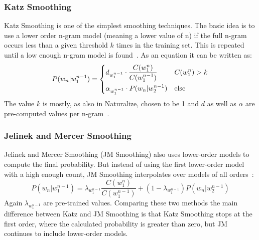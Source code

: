 \subsubsection{Katz Smoothing}
Katz Smoothing is one of the simplest smoothing techniques. The basic idea is to use a lower order n-gram model (meaning a lower value of n) if the full n-gram occurs less than a given threshold $k$ times in the training set. This is repeated until a low enough n-gram model is found~\cite{katz1987estimation}. As an equation it can be written as:
\begin{equation}
    P(w_n | w_1^{n-1}) = 
    \begin{dcases}
    d_{w_1^{n-1}}\cdot \frac{C(w_1^n)}{C(w_1^{n-1})} & C(w_1^n) > k\\
    \alpha_{w_1^{n-1}} \cdot P(w_n | w_2^{n-1}) & \text{else}
    \end{dcases}
\end{equation}
The value $k$ is mostly, as also in Naturalize, chosen to be 1 and $d$ as well as $\alpha$ are pre-computed values per n-gram~\cite{katz1987estimation}.
\subsubsection{Jelinek and Mercer Smoothing}
Jelinek and Mercer Smoothing (JM Smoothing) also uses lower-order models to compute the final probability. But instead of using the first lower-order model with a high enough count, JM Smoothing interpolates over models of all orders~\cite{smoothingStudy}:
\begin{equation}
    P(w_n | w_1^{n-1})=\lambda_{w_1^{n-1}}\frac{C(w_1^n)}{C(w_1^{n-1})} + (1-\lambda_{w_1^{n-1}})P(w_n | w_2^{n-1})
\end{equation}
Again $\lambda_{w_1^{n-1}}$ are pre-trained values. Comparing these two methods the main difference between Katz and JM Smoothing is that Katz Smoothing stops at the first order, where the calculated probability is greater than zero, but JM continues to include lower-order models.